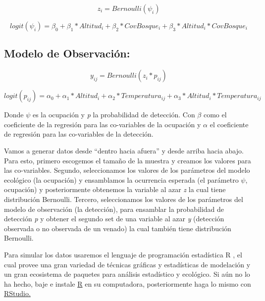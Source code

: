 \documentclass[
]{book}
\begin{document}
\begin{equation}
z _{i} = Bernoulli (\psi _{i})
  \label{eq:binom}
\end{equation}

\begin{equation}
logit(\psi _{i}) = \beta _{0} + \beta _{1} \ast Altitud _{i} + \beta _{2}\ast CovBosque _{i} + \beta _{3} \ast Altitud _{i} \ast CovBosque _{i}
  \label{eq:binom}
\end{equation}

\hypertarget{modelo-de-observaciuxf3n}{%
\subsection{Modelo de Observación:}\label{modelo-de-observaciuxf3n}}

\begin{equation}
y _{ij} = Bernoulli (z _{i} * p _{ij})
  \label{eq:binom}
\end{equation}

\begin{equation}
logit(p _{ij}) = \alpha  _{0} + \alpha  _{1} \ast Altitud _{i} + \alpha  _{2}\ast Temperatura _{ij} + \alpha _{3} \ast Altitud _{i} \ast Temperatura _{ij}
  \label{eq:binom}
\end{equation}

Donde \(\psi\) es la ocupación y \emph{p} la probabilidad de detección. Con \(\beta\) como el coeficiente de la regresión para las co-variables de la ocupación y \(\alpha\) el coeficiente de regresión para las co-variables de la detección.

Vamos a generar datos desde ``dentro hacia afuera'' y desde arriba hacia abajo. Para esto, primero escogemos el tamaño de la muestra y creamos los valores para las co-variables. Segundo, seleccionamos los valores de los parámetros del modelo ecológico (la ocupación) y ensamblamos la ocurrencia esperada (el parámetro \(\psi\), ocupación) y posteriormente obtenemos la variable al azar \emph{z} la cual tiene distribución Bernoulli. Tercero, seleccionamos los valores de los parámetros del modelo de observación (la detección), para ensamblar la probabilidad de detección \emph{p} y obtener el segundo set de una variable al azar \emph{y} (detección observada o no observada de un venado) la cual también tiene distribución Bernoulli.

Para simular los datos usaremos el lenguaje de programación estadística R \citep{RCoreTeam2016}, el cual provee una gran variedad de técnicas gráficas y estadísticas de modelación y un gran ecosistema de paquetes para análisis estadístico y ecológico. Si aún no lo ha hecho, baje e instale \href{http://www.r-project.org/}{R} en su computadora, posteriormente haga lo mismo con \href{http://www.rstudio.com/}{RStudio.}
\end{document}
